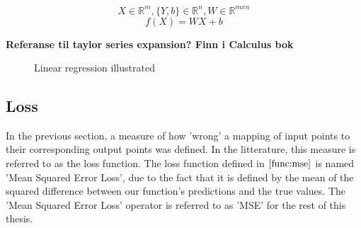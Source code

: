 \[
    X \in \mathbb{R}^m, \{Y, b\} \in \mathbb{R}^n, W \in \mathbb{R}^{m x n}
\]
\[
    f(X) = WX + b \tag{2.3} \label{func:linearLayer}
\]
 
\textbf{Referanse til taylor series expansion? Finn i Calculus bok}

\begin{figure}
    \centering
    \qquad
    \caption{Linear regression illustrated}%
    \label{fig:linearRegression}%
\end{figure}



\subsection{Loss}

In the previous section, a measure of how 'wrong' a mapping of input points to their corresponding output points was defined.
In the litterature, this measure is referred to as the loss function. 
The loss function defined in $ \eqref{func:mse} $ is named 'Mean Squared Error Loss', 
due to the fact that it is defined by the mean of the squared difference between our function's predictions and the true values.
The 'Mean Squared Error Loss' operator is referred to as 'MSE' for the rest of this thesis.

